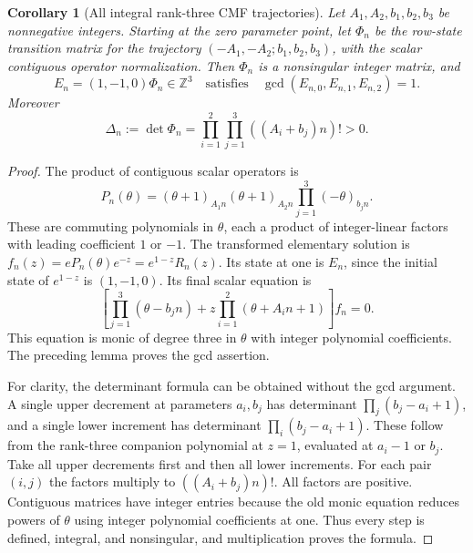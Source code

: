 \documentclass[11pt,a4paper]{article}
\newtheorem{corollary}[theorem]{Corollary}
\theoremstyle{definition}
\theoremstyle{remark}
\numberwithin{equation}{section}
\begin{document}
\begin{corollary}[All integral rank-three CMF trajectories]
\label{p5:cor:primitive-cmf-jet}
Let $A_1,A_2,b_1,b_2,b_3$ be nonnegative integers. Starting at the zero
parameter point, let $\Phi_n$ be the row-state transition matrix for
the trajectory $(-A_1,-A_2;b_1,b_2,b_3)$, with the scalar contiguous
operator normalization. Then $\Phi_n$ is a nonsingular integer matrix,
and
\[
 E_n=(1,-1,0)\Phi_n\in\mathbb Z^3
 \quad\text{satisfies}\quad \gcd(E_{n,0},E_{n,1},E_{n,2})=1.
\]
Moreover
\begin{equation}\label{p5:eq:primitive-cmf-det}
 \Delta_n:=\det\Phi_n
 =\prod_{i=1}^2\prod_{j=1}^3((A_i+b_j)n)!>0.
\end{equation}
\end{corollary}
\begin{proof}
The product of contiguous scalar operators is
\[
 P_n(\theta)=(\theta+1)_{A_1n}(\theta+1)_{A_2n}
                 \prod_{j=1}^3(-\theta)_{b_jn}.
\]
These are commuting polynomials in $\theta$, each a product of
integer-linear factors with leading coefficient $1$ or $-1$.
The transformed elementary solution is
$f_n(z)=e P_n(\theta)e^{-z}=e^{1-z}R_n(z)$.
Its state at one is $E_n$, since the initial state of $e^{1-z}$
is $(1,-1,0)$. Its final scalar equation is
\[
 \left[\prod_{j=1}^3(\theta-b_jn)
       +z\prod_{i=1}^2(\theta+A_in+1)\right]f_n=0.
\]
This equation is monic of degree three in $\theta$ with integer
polynomial coefficients. The preceding lemma proves the gcd assertion.

For clarity, the determinant formula can be obtained without the gcd
argument. A single upper decrement at parameters $a_i,b_j$ has
determinant $\prod_j(b_j-a_i+1)$, and a single lower increment has
determinant $\prod_i(b_j-a_i+1)$. These follow from the rank-three
companion polynomial at $z=1$, evaluated at $a_i-1$ or $b_j$.
Take all upper decrements first and then all lower increments.
For each pair $(i,j)$ the factors multiply to $((A_i+b_j)n)!$.
All factors are positive. Contiguous matrices have integer entries
because the old monic equation reduces powers of $\theta$ using
integer polynomial coefficients at one. Thus every step is defined,
integral, and nonsingular, and multiplication proves the formula.
\end{proof}
\end{document}
